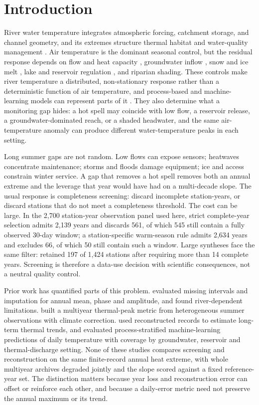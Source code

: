 \section{Introduction}

River water temperature integrates atmospheric forcing, catchment storage, and channel geometry, and its extremes structure thermal habitat and water-quality management \citep{webb2008,mohseni1998}. Air temperature is the dominant seasonal control, but the residual response depends on flow and heat capacity \citep{vanvliet2011,toffolon2015}, groundwater inflow \citep{johnson2021,gallice2015}, snow and ice melt \citep{isaak2012,arismendi2014}, lake and reservoir regulation \citep{beaufort2022,diaz2025}, and riparian shading. These controls make river temperature a distributed, non-stationary response rather than a deterministic function of air temperature, and process-based and machine-learning models can represent parts of it \citep{feigl2021,rahmani2021}. They also determine what a monitoring gap hides: a hot spell may coincide with low flow, a reservoir release, a groundwater-dominated reach, or a shaded headwater, and the same air-temperature anomaly can produce different water-temperature peaks in each setting.

Long summer gaps are not random. Low flows can expose sensors; heatwaves concentrate maintenance; storms and floods damage equipment; ice and access constrain winter service. A gap that removes a hot spell removes both an annual extreme and the leverage that year would have had on a multi-decade slope. The usual response is completeness screening: discard incomplete station-years, or discard stations that do not meet a completeness threshold. The cost can be large. In the 2,700 station-year observation panel used here, strict complete-year selection admits 2,139 years and discards 561, of which 545 still contain a fully observed 30-day window; a station-specific warm-season rule admits 2,634 years and excludes 66, of which 50 still contain such a window. Large syntheses face the same filter: \citet{hare2021} retained 197 of 1,424 stations after requiring more than 14 complete years. Screening is therefore a data-use decision with scientific consequences, not a neutral quality control.

Prior work has quantified parts of this problem. \citet{johnson2021} evaluated missing intervals and imputation for annual mean, phase and amplitude, and found river-dependent limitations. \citet{beaufort2022} built a multiyear thermal-peak metric from heterogeneous summer observations with climate correction. \citet{isaak2012} used reconstructed records to estimate long-term thermal trends, and \citet{diaz2025} evaluated process-stratified machine-learning predictions of daily temperature with coverage by groundwater, reservoir and thermal-discharge setting. None of these studies compares screening and reconstruction on the same finite-record annual heat extreme, with whole multiyear archives degraded jointly and the slope scored against a fixed reference-year set. The distinction matters because year loss and reconstruction error can offset or reinforce each other, and because a daily-error metric need not preserve the annual maximum or its trend.

